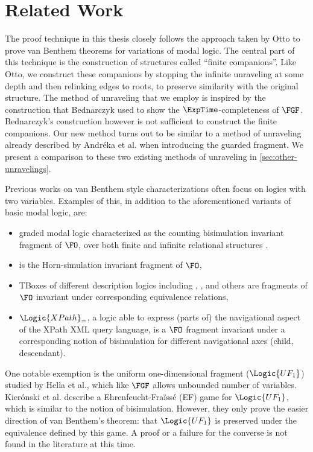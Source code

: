 \section{Related Work}

The proof technique in this thesis closely follows the approach taken by Otto to prove van Benthem theorems for variations of modal logic\cite{Otto04, otto2004a}.
The central part of this technique is the construction of structures called ``finite companions''.
Like Otto, we construct these companions by stopping the infinite unraveling at some depth and then relinking edges to roots, to preserve similarity with the original structure.
The method of unraveling that we employ is inspired by the construction that Bednarczyk used to show the $\ExpTime$-completeness of $\FGF$\cite{Bednarczyk21}.
Bednarczyk's construction however is not sufficient to construct the finite companions.
Our new method turns out to be similar to a method of unraveling already described by Andréka et al. when introducing the guarded fragment\cite{AndrekaNB98}.
We present a comparison to these two existing methods of unraveling in \cref{sec:other-unravelings}.

Previous works on van Benthem style characterizations often focus on logics with two variables.
Examples of this, in addition to the aforementioned variants of basic modal logic, are:
\begin{itemize}
  \item graded modal logic characterized as the counting bisimulation invariant fragment of $\FO$, over both finite and infinite relational structures \cite{derijke2000,otto2023}.
  \item {} is the Horn-simulation invariant fragment of $\FO$\cite{jung2019},
  \item TBoxes of different description logics including , ,  and others are fragments of $\FO$ invariant under corresponding equivalence relations\cite{lutz2011, piro2013},
  \item $\Logic{XPath}_{=}$, a logic able to express (parts of) the navigational aspect of the XPath XML query language, is a $\FO$ fragment invariant under a corresponding notion of bisimulation for different navigational axes (child, descendant)\cite{figueira2015}.
\end{itemize}
One notable exemption is the uniform one-dimensional fragment ($\Logic{UF_{1}}$) studied by Hella et al.\cite{hella2014}, which like $\FGF$ allows unbounded number of variables.
Kierónski et al. describe a Ehrenfeucht-Fraïssé (EF) game for $\Logic{UF_{1}}$, which is similar to the notion of bisimulation.
However, they only prove the easier direction of van Benthem's theorem: that $\Logic{UF_{1}}$  is preserved under the equivalence defined by this game.
A proof or a failure for the converse is not found in the literature at this time.

